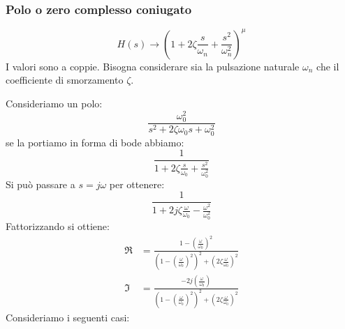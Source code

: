 \documentclass[a4paper]{article}
\begin{document}
\subsubsection{Polo o zero complesso coniugato}
\[
  H(s) \to \left( 1 + 2 \zeta \frac{s}{\omega_n} + \frac{s^2}{\omega_n^2} \right)^{\mu}
\]
\label{09-12-D8}
I valori sono a coppie. Bisogna considerare sia la pulsazione naturale \( \omega_n \)
che il coefficiente di smorzamento \( \zeta \).

\vspace{1em}
\noindent
Consideriamo un polo:
\[
\frac{\omega_0^2}{s^2 + 2 \zeta \omega_0s + \omega_0^2}
\] 
se la portiamo in forma di bode abbiamo:
\[
\frac{1}{
  1 + 2 \zeta \frac{s}{\omega_0} + \frac{s^2}{\omega_0^2}
}
\] 
Si può passare a \( s = j \omega \) per ottenere:
\[
\frac{1}{
  1 + 2 j \zeta \frac{\omega}{\omega_0} - \frac{\omega^2}{\omega_0^2}
}
\] 
Fattorizzando si ottiene:
\[
  \begin{aligned}
    \Re &= \frac{1 - \left( \frac{\omega}{\omega_0} \right)^2 }{
      \left( 1 - \left( \frac{\omega}{\omega_0} \right) ^2 \right) ^2 + \left( 2 \zeta \frac{\omega}{\omega_0} \right) ^2
    }\\
    \Im &= \frac{-2j \left( \frac{\omega}{\omega_0} \right) }{
      \left( 1 - \left( \frac{\omega}{\omega_0} \right) ^2 \right) ^2 
      + \left( 2 \zeta \frac{\omega}{\omega_0} \right) ^2
    }
  \end{aligned}
\] 
Consideriamo i seguenti casi:
\end{document}
